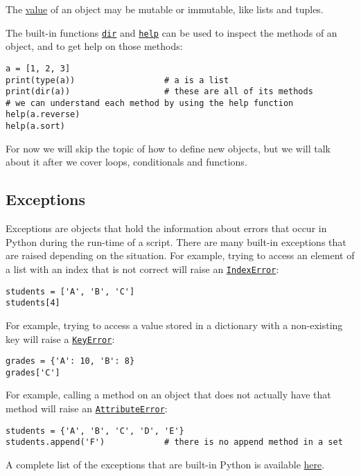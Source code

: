 \documentclass[12pt, a4paper]{article}
\begin{document}
The \uline{value} of an object may be mutable or immutable, like lists and tuples.

The built-in functions \href{https://docs.python.org/3.6/library/functions.html?\#dir}{\texttt{dir}} and \href{https://docs.python.org/3.6/library/functions.html?\#help}{\texttt{help}} can be used to inspect the methods of an object, and to get help on those methods:
\lstset{language=jupyter-python,label= ,caption= ,captionpos=b,numbers=none}
\begin{lstlisting}
a = [1, 2, 3]
print(type(a))                  # a is a list
print(dir(a))                   # these are all of its methods
# we can understand each method by using the help function
help(a.reverse)
help(a.sort)
\end{lstlisting}
For now we will skip the topic of how to define new objects, but we will talk about it after we cover loops, conditionals and functions.

\subsection{Exceptions}
\label{sec:orgf5a5353}
Exceptions are objects that hold the information about errors that occur in Python during the run-time of a script.
There are many built-in exceptions that are raised depending on the situation.
For example, trying to access an element of a list with an index that is not correct will raise an \href{https://docs.python.org/3.6/library/exceptions.html?highlight=indexerror\#IndexError}{\texttt{IndexError}}:
\lstset{language=jupyter-python,label= ,caption= ,captionpos=b,numbers=none}
\begin{lstlisting}
students = ['A', 'B', 'C']
students[4]
\end{lstlisting}

For example, trying to access a value stored in a dictionary with a non-existing key will raise a \href{https://docs.python.org/3.6/library/exceptions.html?\#KeyError}{\texttt{KeyError}}:
\lstset{language=jupyter-python,label= ,caption= ,captionpos=b,numbers=none}
\begin{lstlisting}
grades = {'A': 10, 'B': 8}
grades['C']
\end{lstlisting}

For example, calling a method on an object that does not actually have that method will raise an \href{https://docs.python.org/3.6/library/exceptions.html?\#AttributeError}{\texttt{AttributeError}}:
\lstset{language=jupyter-python,label= ,caption= ,captionpos=b,numbers=none}
\begin{lstlisting}
students = {'A', 'B', 'C', 'D', 'E'}
students.append('F')            # there is no append method in a set
\end{lstlisting}
A complete list of the exceptions that are built-in Python is available \href{https://docs.python.org/3.6/library/exceptions.html\#concrete-exceptions}{here}.
\end{document}
